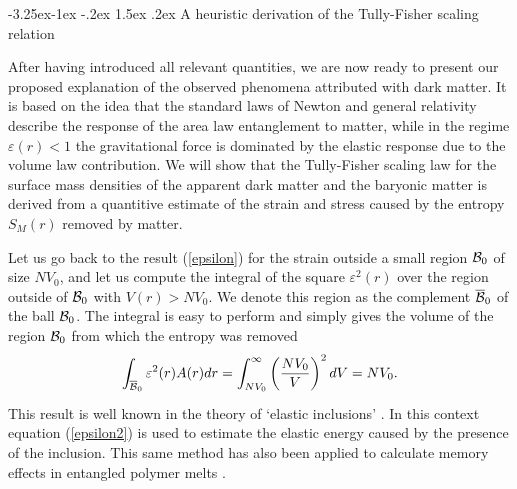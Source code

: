 \documentclass[a4paper,12pt]{article}
\makeatletter
\renewcommand\subsection{\@startsection{subsection}{2}{\z@}%
                                     {-3.25ex\@plus -1ex \@minus -.2ex}%
                                     {1.5ex \@plus .2ex}%
                                     {\normalfont\bfseries}}
\makeatother
\begin{document}







   



\subsection{A heuristic derivation of the Tully-Fisher scaling relation }  
 
After having introduced all relevant quantities, we are now ready to present our proposed explanation of the observed phenomena attributed with dark matter.   It is based on the idea that the standard laws of Newton and general relativity describe the response of the area law entanglement to matter, while in the regime $\varepsilon(r)\!<\!1$ the gravitational force is dominated by the elastic response due to the volume law contribution. We will show that the Tully-Fisher scaling law for the surface mass densities of the apparent dark matter and the baryonic matter is derived from a quantitive estimate of the strain and stress caused by the entropy $S_M(r)$ removed by matter. 



Let us go back to the result (\ref{epsilon}) for  the strain outside a small region ${\cal B}_0$ of size $NV_0$,  %
and let us compute the integral of the square $\varepsilon^2(r)$ over the region outside of ${\cal B}_0$ with $V(r)> NV_0$.  
We denote this region as the complement $\overline{{\cal B}}_0$ of the ball ${\cal B}_0$.  The integral is easy to perform and simply gives the volume of the region ${\cal B}_0$ from which the entropy was removed
\begin{equation}
\label{epsilon2}
\int_{\strut {\overline{\cal B}_0}}\varepsilon^2(r) A(r) dr =\int_{NV_0}^\infty  \left({NV_0\over V}\right)^2 dV = NV_0.
\end{equation}
This result is well known in the theory of `elastic inclusions' \cite{Eshelby}.   In this context equation (\ref{epsilon2}) is used to estimate the elastic energy caused by the presence of the inclusion. This same method has also been applied to calculate memory effects in entangled polymer melts \cite{RubOb}.
 
\end{document}
